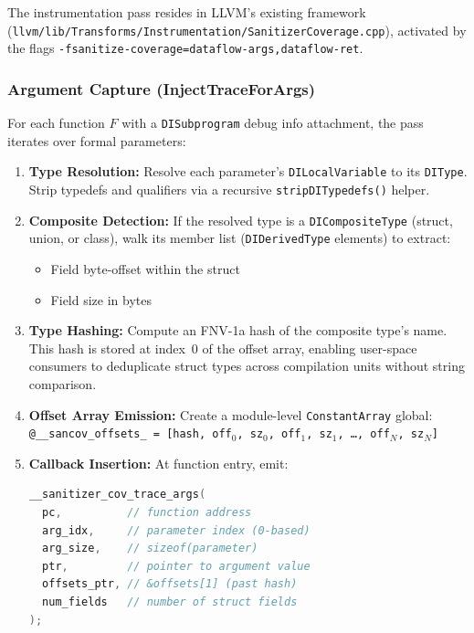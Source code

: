 \documentclass{ndss}
\begin{document}
The instrumentation pass resides in LLVM's existing \sancov framework
(\texttt{llvm/lib/Transforms/Instrumentation/SanitizerCoverage.cpp}), activated
by the flags \texttt{-fsanitize-coverage=dataflow-args,dataflow-ret}.

\subsubsection{Argument Capture (InjectTraceForArgs)}

For each function $F$ with a \texttt{DISubprogram} debug info attachment, the
pass iterates over formal parameters:

\begin{enumerate}[nosep]
  \item \textbf{Type Resolution:} Resolve each parameter's
        \texttt{DILocalVariable} to its \texttt{DIType}. Strip typedefs and
        qualifiers via a recursive \texttt{stripDITypedefs()} helper.
  \item \textbf{Composite Detection:} If the resolved type is a
        \texttt{DICompositeType} (struct, union, or class), walk its member
        list (\texttt{DIDerivedType} elements) to extract:
        \begin{itemize}[nosep]
          \item Field byte-offset within the struct
          \item Field size in bytes
        \end{itemize}
  \item \textbf{Type Hashing:} Compute an FNV-1a hash of the composite type's
        name. This hash is stored at index~0 of the offset array, enabling
        user-space consumers to deduplicate struct types across compilation
        units without string comparison.
  \item \textbf{Offset Array Emission:} Create a module-level
        \texttt{ConstantArray} global:
        \texttt{@\_\_sancov\_offsets\_ = [hash, off$_0$, sz$_0$, off$_1$,
        sz$_1$, \ldots, off$_N$, sz$_N$]}
  \item \textbf{Callback Insertion:} At function entry, emit:
\begin{lstlisting}[language=C,numbers=none]
__sanitizer_cov_trace_args(
  pc,          // function address
  arg_idx,     // parameter index (0-based)
  arg_size,    // sizeof(parameter)
  ptr,         // pointer to argument value
  offsets_ptr, // &offsets[1] (past hash)
  num_fields   // number of struct fields
);
\end{lstlisting}
\end{enumerate}
\end{document}
